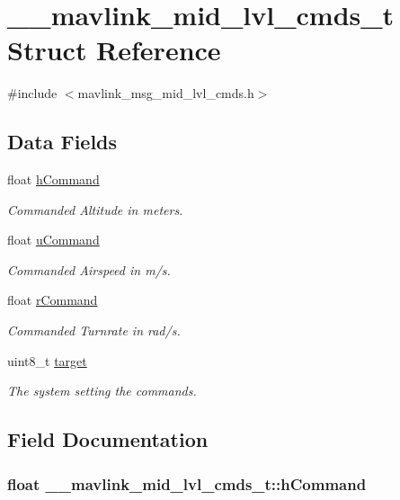 \hypertarget{struct____mavlink__mid__lvl__cmds__t}{\section{\+\_\+\+\_\+mavlink\+\_\+mid\+\_\+lvl\+\_\+cmds\+\_\+t Struct Reference}
\label{struct____mavlink__mid__lvl__cmds__t}
}


{\ttfamily \#include $<$mavlink\+\_\+msg\+\_\+mid\+\_\+lvl\+\_\+cmds.\+h$>$}

\subsection*{Data Fields}
\begin{DoxyCompactItemize}
\item 
float \hyperlink{struct____mavlink__mid__lvl__cmds__t_a6e1a47f96785800a4b294b407088dc5c}{h\+Command}
\begin{DoxyCompactList}\small\item\em Commanded Altitude in meters. \end{DoxyCompactList}\item 
float \hyperlink{struct____mavlink__mid__lvl__cmds__t_a600a326520b65909e7e10e81176de477}{u\+Command}
\begin{DoxyCompactList}\small\item\em Commanded Airspeed in m/s. \end{DoxyCompactList}\item 
float \hyperlink{struct____mavlink__mid__lvl__cmds__t_a878c166fd170d7331278a565501fcd4e}{r\+Command}
\begin{DoxyCompactList}\small\item\em Commanded Turnrate in rad/s. \end{DoxyCompactList}\item 
uint8\+\_\+t \hyperlink{struct____mavlink__mid__lvl__cmds__t_ab0acf8785fcc93f84eb98fdc6bd5b139}{target}
\begin{DoxyCompactList}\small\item\em The system setting the commands. \end{DoxyCompactList}\end{DoxyCompactItemize}


\subsection{Field Documentation}
\hypertarget{struct____mavlink__mid__lvl__cmds__t_a6e1a47f96785800a4b294b407088dc5c}{
\subsubsection[{h\+Command}]{\setlength{\rightskip}{0pt plus 5cm}float \+\_\+\+\_\+mavlink\+\_\+mid\+\_\+lvl\+\_\+cmds\+\_\+t\+::h\+Command}}\label{struct____mavlink__mid__lvl__cmds__t_a6e1a47f96785800a4b294b407088dc5c}


